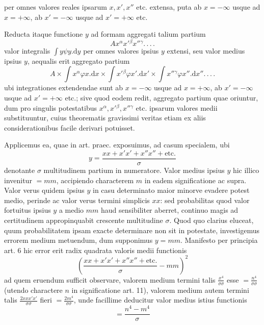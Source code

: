 per omnes valores reales ipsarum \(x,x',x''\) etc. extensa, puta ab \(x=-\infty\) usque ad \(x=+\infty\), ab \(x'=-\infty\) usque ad \(x'=+\infty\) etc.

Reducta itaque functione \(y\) ad formam aggregati talium partium
\[
Ax^\alpha x'{}^\beta x''{}^\gamma\mathord{.}\,\mathord{.}\,\mathord{.}\,\mathord{.}
\]
valor integralis \(\int y\psi y.\mathrm{d}y\) per omnes valores ipsius \(y\) extensi, seu valor medius ipsius \(y\), aequalis erit aggregato partium
\[
A\times\int x^\alpha\varphi x.\mathrm{d}x\times\int x'{}^\beta\varphi x'.\mathrm{d}x'\times\int x''{}^\gamma\varphi x''.\mathrm{d}x''\mathord{.}\,\mathord{.}\,\mathord{.}\,\mathord{.}
\]
ubi integrationes extendendae sunt ab \(x=-\infty\) usque ad \(x=+\infty\), ab \(x'=-\infty\) usque ad \(x'=+\infty\) etc.; sive quod eodem redit, aggregato partium quae oriuntur, dum pro singulis potestatibus \(x^\alpha,x'{}^\beta,x''{}^\gamma\) etc. ipsarum valores medii substituuntur, cuius theorematis gravissimi veritas etiam ex aliis considerationibus facile derivari potuisset.

Applicemus ea, quae in art. praec. exposuimus, ad casum specialem, ubi
\[
y=\frac{xx+x'x'+x''x''+\text{etc.}}{\sigma}
\]
denotante \(\sigma\) multitudinem partium in numeratore. Valor medius ipsius \(y\) hic illico invenitur \(=mm\), accipiendo characterem \(m\) in eadem significatione ac supra. Valor verus quidem ipsius \(y\) in casu determinato maior minorve evadere potest medio, perinde ac valor verus termini simplicis \(xx\): sed probabilitas quod valor fortuitus ipsius \(y\) a medio \(mm\) haud sensibiliter aberret, continuo magis ad certitudinem appropinquabit crescente multitudine \(\sigma\). Quod quo clarius eluceat, quum probabilitatem ipsam exacte determinare non sit in potestate, investigemus errorem medium metuendum, dum supponimus \(y=mm\). Manifesto per principia art. 6 hic error erit radix quadrata valoris medii functionis
\[
\left(\frac{xx+x'x'+x''x''+\text{etc.}}{\sigma}-mm\right)^2
\]
ad quem eruendum sufficit observare, valorem medium termini talis \(\frac{x^4}{\sigma\sigma}\) esse \(=\frac{n^4}{\sigma\sigma}\) (utendo charactere \(n\) in significatione art. 11), valorem medium autem termini talis \(\frac{2xxx'x'}{\sigma\sigma}\) fieri \(=\frac{2m^4}{\sigma\sigma}\), unde facillime deducitur valor medius istius functionis
\[
=\frac{n^4-m^4}{\sigma}
\]

